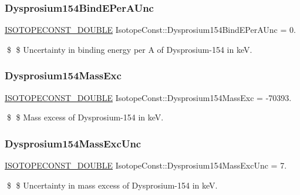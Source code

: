 \subsubsection{\texorpdfstring{Dysprosium154\+Bind\+E\+Per\+A\+Unc}{Dysprosium154BindEPerAUnc}}
{\footnotesize\ttfamily \mbox{\hyperlink{group___isotope_const-_macros_ga8f45a7272ce02c0b4c65c44636ed719a}{I\+S\+O\+T\+O\+P\+E\+C\+O\+N\+S\+T\+\_\+\+D\+O\+U\+B\+LE}} Isotope\+Const\+::\+Dysprosium154\+Bind\+E\+Per\+A\+Unc = 0.}

\$ \$ Uncertainty in binding energy per A of Dysprosium-\/154 in keV. \mbox{\label{group___isotope_const-_dysprosium-_dy154_ga3a855e9643764a72986e17992386e9bf}} 
\subsubsection{\texorpdfstring{Dysprosium154\+Mass\+Exc}{Dysprosium154MassExc}}
{\footnotesize\ttfamily \mbox{\hyperlink{group___isotope_const-_macros_ga8f45a7272ce02c0b4c65c44636ed719a}{I\+S\+O\+T\+O\+P\+E\+C\+O\+N\+S\+T\+\_\+\+D\+O\+U\+B\+LE}} Isotope\+Const\+::\+Dysprosium154\+Mass\+Exc = -\/70393.}

\$ \$ Mass excess of Dysprosium-\/154 in keV. \mbox{\label{group___isotope_const-_dysprosium-_dy154_ga88fe3926756ceee8beac33ae525f50a1}} 
\subsubsection{\texorpdfstring{Dysprosium154\+Mass\+Exc\+Unc}{Dysprosium154MassExcUnc}}
{\footnotesize\ttfamily \mbox{\hyperlink{group___isotope_const-_macros_ga8f45a7272ce02c0b4c65c44636ed719a}{I\+S\+O\+T\+O\+P\+E\+C\+O\+N\+S\+T\+\_\+\+D\+O\+U\+B\+LE}} Isotope\+Const\+::\+Dysprosium154\+Mass\+Exc\+Unc = 7.}

\$ \$ Uncertainty in mass excess of Dysprosium-\/154 in keV. \mbox{\label{group___isotope_const-_dysprosium-_dy154_gac1fe5dbdf01c333a45f03cbe74e0dc80}} 

